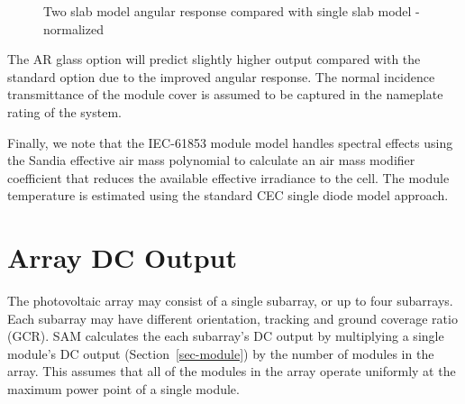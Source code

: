 \documentclass[12pt,letterpaper]{article}
\begin{document}
\begin{figure}[h!]
\begin{center}
\end{center}
\caption{Two slab model angular response compared with single slab model - normalized}
\label{fig_twoslab_norm}
\end{figure}

The AR glass option will predict slightly higher output compared with the standard option due to the improved angular response.  The normal incidence transmittance of the module cover is assumed to be captured in the nameplate rating of the system. 

Finally, we note that the IEC-61853 module model handles spectral effects using the Sandia effective air mass polynomial to calculate an air mass modifier coefficient that reduces the available effective irradiance to the cell. The module temperature is estimated using the standard CEC single diode model approach.

\chapter{Array DC Output}\label{sec-arraydcoutput}

The photovoltaic array may consist of a single subarray, or up to four subarrays. Each subarray may have different orientation, tracking and ground coverage ratio (GCR). SAM calculates the each subarray's DC output by multiplying a single module's DC output (Section~\ref{sec-module}) by the number of modules in the array. This assumes that all of the modules in the array operate uniformly at the maximum power point of a single module. 
\end{document}

